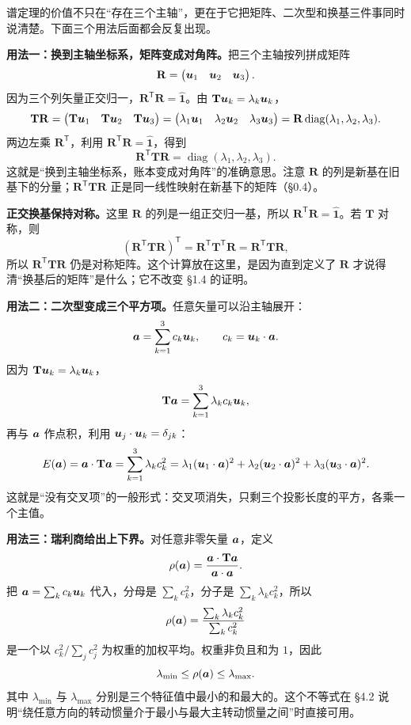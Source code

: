 \documentclass[11pt]{ctexart}
\newcommand{\ten}[1]{\mathbf{#1}}
\newcommand{\unitd}{\hat{\ten{1}}}
\begin{document}
谱定理的价值不只在“存在三个主轴”，更在于它把矩阵、二次型和换基三件事同时说清楚。下面三个用法后面都会反复出现。

\textbf{用法一：换到主轴坐标系，矩阵变成对角阵。}把三个主轴按列拼成矩阵
\[
\ten R=\begin{pmatrix}\vect u_1&\vect u_2&\vect u_3\end{pmatrix}.
\]
因为三个列矢量正交归一，$\ten R^{\mathsf T}\ten R=\unitd$。由 $\ten T\vect u_k=\lambda_k\vect u_k$，
\[
\ten T\ten R
=\begin{pmatrix}\ten T\vect u_1&\ten T\vect u_2&\ten T\vect u_3\end{pmatrix}
=\begin{pmatrix}\lambda_1\vect u_1&\lambda_2\vect u_2&\lambda_3\vect u_3\end{pmatrix}
=\ten R\operatorname{diag}(\lambda_1,\lambda_2,\lambda_3).
\]
两边左乘 $\ten R^{\mathsf T}$，利用 $\ten R^{\mathsf T}\ten R=\unitd$，得到
\[
\ten R^{\mathsf T}\ten T\ten R
=\operatorname{diag}(\lambda_1,\lambda_2,\lambda_3).
\]
这就是“换到主轴坐标系，账本变成对角阵”的准确意思。注意 $\ten R$ 的列是新基在旧基下的分量；$\ten R^{\mathsf T}\ten T\ten R$ 正是同一线性映射在新基下的矩阵（\S0.4）。

\textbf{正交换基保持对称。}这里 $\ten R$ 的列是一组正交归一基，所以 $\ten R^{\mathsf T}\ten R=\unitd$。若 $\ten T$ 对称，则
\[
(\ten R^{\mathsf T}\ten T\ten R)^{\mathsf T}
=\ten R^{\mathsf T}\ten T^{\mathsf T}\ten R
=\ten R^{\mathsf T}\ten T\ten R,
\]
所以 $\ten R^{\mathsf T}\ten T\ten R$ 仍是对称矩阵。这个计算放在这里，是因为直到定义了 $\ten R$ 才说得清“换基后的矩阵”是什么；它不改变 \S1.4 的证明。

\textbf{用法二：二次型变成三个平方项。}任意矢量可以沿主轴展开：
\[
\boldsymbol{a}=\sum_{k=1}^{3}c_k\boldsymbol{u}_k,
\qquad
c_k=\boldsymbol{u}_k\cdot\boldsymbol{a} .
\]
因为 $\ten T\vect u_k=\lambda_k\vect u_k$，
\[
\ten T\vect a=\sum_{k=1}^{3}\lambda_k c_k\vect u_k,
\]
再与 $\boldsymbol{a}$ 作点积，利用 $\boldsymbol{u}_j\cdot\boldsymbol{u}_k=\delta_{jk}$：
\[
E(\vect a)=\vect a\cdot\ten T\vect a
=\sum_{k=1}^{3}\lambda_k c_k^2
=\lambda_1(\vect u_1\cdot\vect a)^2
+\lambda_2(\vect u_2\cdot\vect a)^2
+\lambda_3(\vect u_3\cdot\vect a)^2 .
\]
这就是“没有交叉项”的一般形式：交叉项消失，只剩三个投影长度的平方，各乘一个主值。

\textbf{用法三：瑞利商给出上下界。}对任意非零矢量 $\boldsymbol{a}$，定义
\[
\rho(\vect a)=\frac{\vect a\cdot\ten T\vect a}{\vect a\cdot\vect a}.
\]
把 $\boldsymbol{a}=\sum_k c_k\boldsymbol{u}_k$ 代入，分母是 $\sum_k c_k^2$，分子是 $\sum_k\lambda_k c_k^2$，所以
\[
\rho(\boldsymbol{a})
=\frac{\sum_k\lambda_k c_k^2}{\sum_k c_k^2}
\]
是一个以 $c_k^2/\sum_j c_j^2$ 为权重的加权平均。权重非负且和为 $1$，因此
\[
\lambda_{\min}\le\rho(\boldsymbol{a})\le\lambda_{\max}.
\]
其中 $\lambda_{\min}$ 与 $\lambda_{\max}$ 分别是三个特征值中最小的和最大的。这个不等式在 \S4.2 说明“绕任意方向的转动惯量介于最小与最大主转动惯量之间”时直接可用。
\end{document}
